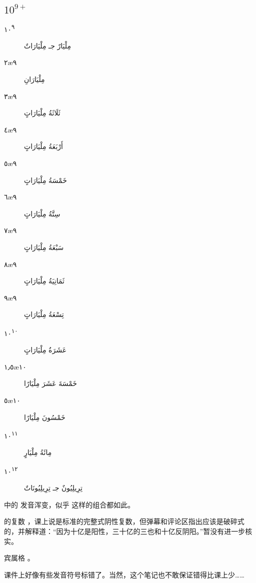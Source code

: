 \subsection{$10^{9+}$}

\begin{Arabic}
    \begin{multicols}{2}
        \begin{description}
            \item[١٠\textsuperscript{٩}] مِلْيَارٌ جـ مِلْيَارَاتٌ
            \item[٢\ae{٩}] مِلْيَارَانِ
            \item[٣\ae{٩}] ثَلَاثَةُ مِلْيَارَاتٍ
            \item[٤\ae{٩}] أَرْبَعَةُ مِلْيَارَاتٍ
            \item[٥\ae{٩}] خَمْسَةُ مِلْيَارَاتٍ
            \item[٦\ae{٩}] سِتَّةُ مِلْيَارَاتٍ
            \item[٧\ae{٩}] سَبْعَةُ مِلْيَارَاتٍ
            \item[٨\ae{٩}] ثَمَانِيَةُ مِلْيَارَاتٍ
            \item[٩\ae{٩}] تِسْعَةُ مِلْيَارَاتٍ
            \item[١٠\textsuperscript{١٠}] عَشَرَةُ مِلْيَارَاتٍ
            \item[١٫٥\ae{١٠}] خَمْسَةَ عَشَرَ مِلْيَارًا
            \item[٥\ae{١٠}] خَمْسُونَ مِلْيَارًا
            \item[١٠\textsuperscript{١١}] مِائَةُ مِلْيَارٍ
            \item[١٠\textsuperscript{١٢}] تِرِيلِيُونٌ جـ تِرِيلِيُونَاتٌ
        \end{description}
    \end{multicols}
\end{Arabic}

\begin{attention}
     中的  发音浑变，似乎  这样的组合都如此。

     的复数  ，课上说是标准的完整式阴性复数，但弹幕和评论区指出应该是破碎式的，并解释道：``因为十亿是阳性，三十亿的三也和十亿反阴阳。''暂没有进一步核实。

     宾属格  。
\end{attention}

\begin{note}
    课件上好像有些发音符号标错了。当然，这个笔记也不敢保证错得比课上少……
\end{note}

